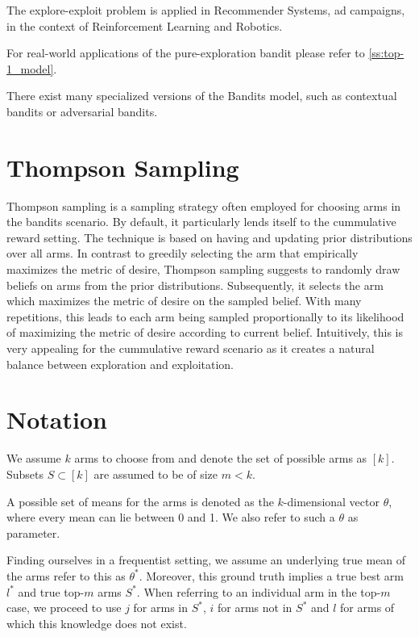 The explore-exploit problem is applied in Recommender Systems, ad campaigns, in the context of Reinforcement Learning and Robotics.

For real-world applications of the pure-exploration bandit please refer to \ref{ss:top-1_model}.

There exist many specialized versions of the Bandits model, such as contextual bandits or adversarial bandits.

\section{Thompson Sampling}

Thompson sampling is a sampling strategy often employed for choosing arms in the bandits scenario. By default, it particularly lends itself to the cummulative reward setting. The technique is based on having and updating prior distributions over all arms. In contrast to greedily selecting the arm that empirically maximizes the metric of desire, Thompson sampling suggests to randomly draw beliefs on arms from the prior distributions. Subsequently, it selects the arm which maximizes the metric of desire on the sampled belief.
With many repetitions, this leads to each arm being sampled proportionally to its likelihood of maximizing the metric of desire according to current belief.
Intuitively, this is very appealing for the cummulative reward scenario as it creates a natural balance between exploration and exploitation.


\section{Notation}

We assume $k$ arms to choose from and denote the set of possible arms as $[k]$. Subsets $S \subset [k]$ are assumed to be of size $m < k$.

A possible set of means for the arms is denoted as the $k$-dimensional vector $\theta$, where every mean can lie between 0 and 1. We also refer to such a $\theta$ as parameter.

Finding ourselves in a frequentist setting, we assume an underlying true mean of the arms refer to this as $\theta^*$. Moreover, this ground truth implies a true best arm $l^*$ and true top-$m$ arms $S^*$. When referring to an individual arm in the top-$m$ case, we proceed to use $j$ for arms in $S^*$, $i$ for arms not in $S^*$ and $l$ for arms of which this knowledge does not exist.

